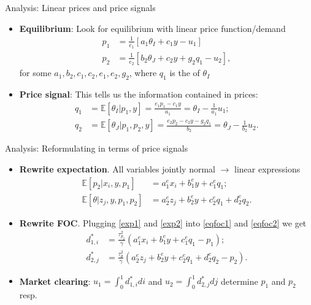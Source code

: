 \documentclass[english,10pt
,aspectratio=169
]{beamer}
\begin{document}
\begin{frame}{Analysis: Linear prices and price signals}
	\begin{itemize}
		\item \textbf{Equilibrium}: Look for equilibrium with linear price function/demand
		\begin{align}
			p_1 & = \frac{1}{e_1}\left[a_1 \theta_I + c_1 y - u_1 \right]\label{price1}\\
			p_2 & =\frac{1}{e_2}\left[ b_2 \theta_J + c_2 y +  g_2 q_1-u_2 \right], \label{price2}
		\end{align}
		for some $a_1,b_2,c_1,c_2,e_1,e_2,g_2$, 
		where $q_1$ is the  of $\theta_I$
		\item \textbf{Price signal}: This tells us the information contained in prices:
		\begin{align}
			q_1 & = \mathbb{E}[\theta_I|p_1,y]= \frac{e_1 p_1-c_1 y}{a_1} = \theta_I - \frac{1}{a_1} u_1 ; \label{signal1} \\
			q_2 &=\mathbb{E}[\theta_J|p_1,p_2,y]= \frac{e_2 p_2-c_2 y - g_2 q_1}{b_2} = \theta_J - \frac{1}{b_2} u_2. \label{signal2}
		\end{align}
	\end{itemize}
\end{frame}


\begin{frame}{Analysis: Reformulating in terms of price signals}
	\begin{itemize}
		\item \textbf{Rewrite expectation}. All variables jointly normal $\rightarrow$ linear expressions
		\begin{align}
		\mathbb{E}[p_2| x_i, y, p_1] & = a^e_1 x_i+b^e_1 y +c^e_1 q_1;   \label{exp1} \\
		\mathbb{E}[\theta| z_j, y, p_1, p_2] & =  a^e_2 z_j+b^e_2 y +c^e_2 q_1 +d^e_2 q_2. \label{exp2}
		\end{align}
		\item \textbf{Rewrite FOC}. Plugging \eqref{exp1} and \eqref{exp2} into \eqref{eqfoc1} and \eqref{eqfoc2} we get
		\begin{align}
		d^*_{1,i} &= \frac{\tau^2_{p_2}}{\gamma}(a^e_1 x_i+b^e_1 y +c^e_1 q_1 - p_1); \label{eqfocb1} \\
		d^*_{2,j} &= \frac{\tau^2_\theta}{\gamma}(a^e_2 z_j+b^e_2 y +c^e_2 q_1 +d^e_2 q_2 - p_2). \label{eqfocb2}
		\end{align}
		\item \textbf{Market clearing}: $u_1=\int_0^1 d^*_{1,i} di$ and $u_2=\int_0^1 d^*_{2,j} dj$ determine $p_1$ and $p_2$ resp.
	\end{itemize}
\end{frame}
\end{document}
